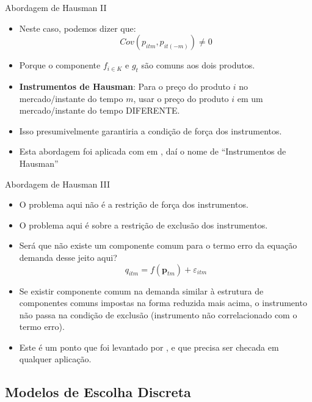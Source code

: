 \documentclass{beamer}
\begin{document}
\begin{frame}{Abordagem de Hausman II}
\begin{itemize}
    \item Neste caso, podemos dizer que:
    \[
    Cov(p_{itm},p_{it(-m)}) \neq 0
    \]
    \item Porque o componente $f_{i \in K}$ e $g_{t}$ são  comuns aos dois produtos.
    \item \textbf{Instrumentos de Hausman}: Para o preço do produto $i$ no mercado/instante do tempo  $m$, usar o preço do produto $i$ em um mercado/instante do tempo DIFERENTE.
    \item Isso presumivelmente garantiria a condição de força dos instrumentos.
    \item Esta abordagem foi aplicada com em \citet{HLZ94}, daí o nome de ``Instrumentos de Hausman''
\end{itemize}

    
\end{frame}

\begin{frame}{Abordagem de Hausman III}
\begin{itemize}
    \item O problema aqui não é a restrição de força dos instrumentos.
    \item O problema aqui é sobre a restrição de exclusão dos instrumentos. 
    \item Será que não existe um componente comum para o termo erro da equação demanda desse jeito aqui?
    \[
    q_{itm}=f(\mathbf{p}_{tm})+\varepsilon_{itm}
    \]
    \item Se existir componente comum na demanda similar à estrutura de componentes comuns impostas na forma reduzida mais acima, o instrumento não passa na condição de exclusão (instrumento não correlacionado com o termo erro).
    \item Este é um ponto que foi levantado por \citet{Bresnahan1997a}, e que precisa ser checada em qualquer aplicação.
\end{itemize}
    
\end{frame}

\subsection{Modelos de Escolha Discreta}
\end{document}
